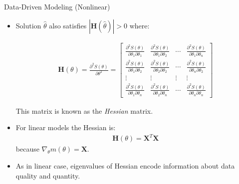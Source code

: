 \documentclass[9pt]{beamer}
\begin{document}
%
\begin{frame}{Data-Driven Modeling (Nonlinear)}

\begin{itemize}
\setlength{\itemsep}{10pt}
\item Solution $\hat{\theta}$ also satisfies $|\mathbf{H}(\hat{\theta})|>0$ where:
\begin{footnotesize}
\begin{align*}
\mathbf{H}(\theta)=\frac{\partial^2 S(\theta)}{\partial \theta^2}=
\left[\begin{array}{ccccccccc}
\frac{\partial^2 S(\theta)}{\partial \theta_1\partial \theta_1}&\frac{\partial^2 S(\theta)}{\partial \theta_1\partial \theta_2}&\cdots& \frac{\partial^2 S(\theta)}{\partial \theta_1\partial \theta_n}\\
\frac{\partial^2 S(\theta)}{\partial \theta_1\partial \theta_2}&\frac{\partial^2 S(\theta)}{\partial \theta_2\partial \theta_2}&\cdots&\frac{\partial^2 S(\theta)}{\partial \theta_n\partial \theta_2}\\
\vdots & \vdots &\vdots &\vdots\\
\frac{\partial^2 S(\theta)}{\partial \theta_1\partial \theta_n}&\frac{\partial^2 S(\theta)}{\partial \theta_2\partial \theta_n}&\cdots& \frac{\partial^2 S(\theta)}{\partial \theta_n\partial \theta_n}
\end{array}\right]
\end{align*}
\end{footnotesize}
This matrix is known as the {\em Hessian} matrix. 
\item For linear models the Hessian is:
\begin{align*}
\mathbf{H}(\theta)=\mathbf{X}^T\mathbf{X}
\end{align*}
because  $\nabla_\theta m(\theta)=\mathbf{X}$.  
\item As in linear case, eigenvalues of Hessian encode information about data quality and quantity. 
\end{itemize}
\end{frame}
\end{document}
